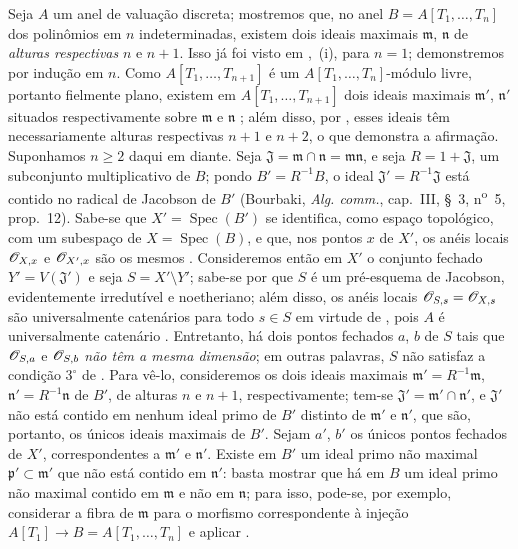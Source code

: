 \begin{env}[10.7.3]
\label{IV.10.7.3}
Seja $A$ um anel de valuação discreta; mostremos que, no anel $B=A[T_1,\ldots,T_n]$ dos polinômios em $n$ indeterminadas, existem dois ideais maximais $\mathfrak m$, $\mathfrak n$ de \emph{alturas respectivas} $n$ e $n+1$.
Isso já foi visto em ,~(i), para $n=1$; demonstremos por indução em $n$.
Como $A[T_1,\ldots,T_{n+1}]$ é um $A[T_1,\ldots,T_n]$-módulo livre, portanto fielmente plano, existem em $A[T_1,\ldots,T_{n+1}]$ dois ideais maximais $\mathfrak m'$, $\mathfrak n'$ situados respectivamente sobre $\mathfrak m$ e $\mathfrak n$ ; além disso, por , esses ideais têm necessariamente alturas respectivas $n+1$ e $n+2$, o que demonstra a afirmação.
Suponhamos $n\geq2$ daqui em diante.
Seja $\mathfrak J=\mathfrak m\cap\mathfrak n=\mathfrak m\mathfrak n$, e seja $R=1+\mathfrak J$, um subconjunto multiplicativo de $B$; pondo $B'=R^{-1}B$, o ideal $\mathfrak J'=R^{-1}\mathfrak J$ está contido no radical de Jacobson de $B'$ (Bourbaki, \emph{Alg. comm.}, cap.~III, \S~3, n\textsuperscript{o}~5, prop.~12).
Sabe-se que $X'=\operatorname{Spec}(B')$ se identifica, como espaço topológico, com um subespaço de $X=\operatorname{Spec}(B)$, e que, nos pontos $x$ de $X'$, os anéis locais $\mathscr{O}_{X,x}$ e $\mathscr{O}_{X',x}$ são os mesmos .
Consideremos então em $X'$ o conjunto fechado $Y'=V(\mathfrak J')$ e seja $S=X'\setminus Y'$; sabe-se por  que $S$ é um pré-esquema de Jacobson, evidentemente irredutível e noetheriano; além disso, os anéis locais $\mathscr{O}_{S,s}=\mathscr{O}_{X,s}$ são universalmente catenários para todo $s\in S$ em virtude de , pois $A$ é universalmente catenário .
Entretanto, há dois pontos fechados $a$, $b$ de $S$ tais que $\mathscr{O}_{S,a}$ e $\mathscr{O}_{S,b}$ \emph{não têm a mesma dimensão}; em outras palavras, $S$ não satisfaz a condição $3^\circ$ de .
Para vê-lo, consideremos os dois ideais maximais $\mathfrak m'=R^{-1}\mathfrak m$, $\mathfrak n'=R^{-1}\mathfrak n$ de $B'$, de alturas $n$ e $n+1$, respectivamente; tem-se $\mathfrak J'=\mathfrak m'\cap\mathfrak n'$, e $\mathfrak J'$ não está contido em nenhum ideal primo de $B'$ distinto de $\mathfrak m'$ e $\mathfrak n'$, que são, portanto, os únicos ideais maximais de $B'$.
Sejam $a'$, $b'$ os únicos pontos fechados de $X'$, correspondentes a $\mathfrak m'$ e $\mathfrak n'$.
Existe em $B'$ um ideal primo não maximal $\mathfrak p'\subset\mathfrak m'$ que não está contido em $\mathfrak n'$: basta mostrar que há em $B$ um ideal primo não maximal contido em $\mathfrak m$ e não em $\mathfrak n$; para isso, pode-se, por exemplo, considerar a fibra de $\mathfrak m$ para o morfismo correspondente à injeção $A[T_1]\to B=A[T_1,\ldots,T_n]$ e aplicar .

\end{env}
